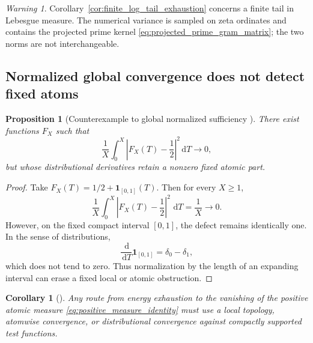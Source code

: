 \documentclass[11pt]{amsart}
\numberwithin{equation}{section}
\theoremstyle{plain}
\newtheorem{proposition}[theorem]{Proposition}
\newtheorem{corollary}[theorem]{Corollary}
\theoremstyle{definition}
\theoremstyle{remark}
\newtheorem{warning}[theorem]{Warning}
\newcommand{\1}{\mathbf{1}}
\newcommand{\dd}{\,\mathrm{d}}
\begin{document}
\begin{warning}
\label{warn:finite_tail_not_full_residual}
Corollary~\ref{cor:finite_log_tail_exhaustion} concerns a finite tail in
Lebesgue measure.  The numerical variance is sampled on zeta ordinates and
contains the projected prime kernel \eqref{eq:projected_prime_gram_matrix}; the two norms are
not interchangeable.
\end{warning}

\subsection{Normalized global convergence does not detect fixed atoms}
\label{subsec:global_not_local}


\begin{proposition}[Counterexample to global normalized sufficiency {}]
\label{prop:global_normalized_counterexample}
There exist functions $F_X$ such that
\begin{equation}
\frac1X\int_0^X
\left|F_X(T)-\frac12\right|^2\dd T
\longrightarrow0,
\label{eq:global_normalized_convergence}
\end{equation}
but whose distributional derivatives retain a nonzero fixed atomic part.
\end{proposition}

\begin{proof}
Take \(F_X(T)=1/2+\1_{[0,1]}(T)\).  Then for every \(X\geq1\),
\begin{equation}
\frac1X\int_0^X\left|F_X(T)-\frac12\right|^2\,\dd T
=
\frac1X\longrightarrow0.
\label{eq:global_counterexample_mean}
\end{equation}
However, on the fixed compact interval \([0,1]\), the defect remains
identically one.  In the sense of distributions,
\begin{equation}
\frac{\dd}{\dd T}\1_{[0,1]}
=
\delta_0-\delta_1,
\label{eq:global_counterexample_derivative}
\end{equation}
which does not tend to zero.  Thus normalization by the length of an
expanding interval can erase a fixed local or atomic obstruction.
\end{proof}


\begin{corollary}[{}]
\label{cor:local_topology_required}
Any route from energy exhaustion to the vanishing of the positive atomic
measure \eqref{eq:positive_measure_identity} must use a local topology,
atomwise convergence, or distributional convergence against compactly
supported test functions.
\end{corollary}
\end{document}
